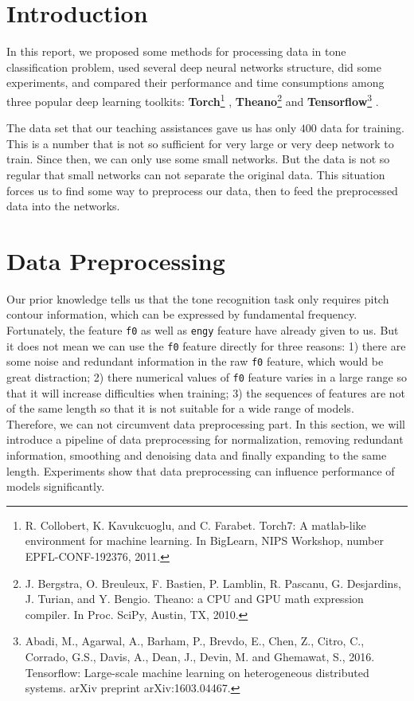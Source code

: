 \documentclass[a4paper]{article}
\begin{document}
\maketitle
\pagebreak

\section{Introduction}

In this report, we proposed some methods for processing data in tone classification problem, used several deep neural networks structure, did some experiments, and compared their performance and time consumptions among three popular deep learning toolkits: {\bf Torch}\footnote{R. Collobert, K. Kavukcuoglu, and C. Farabet. Torch7: A matlab-like environment for machine learning. In BigLearn, NIPS Workshop, number EPFL-CONF-192376, 2011.} , {\bf Theano}\footnote{J. Bergstra, O. Breuleux, F. Bastien, P. Lamblin, R. Pascanu, G. Desjardins, J. Turian, and Y. Bengio. Theano: a CPU and GPU math expression compiler. In Proc. SciPy, Austin, TX, 2010.} and {\bf Tensorflow}\footnote{Abadi, M., Agarwal, A., Barham, P., Brevdo, E., Chen, Z., Citro, C., Corrado, G.S., Davis, A., Dean, J., Devin, M. and Ghemawat, S., 2016. Tensorflow: Large-scale machine learning on heterogeneous distributed systems. arXiv preprint arXiv:1603.04467.} .

The data set that our teaching assistances gave us has only $400$ data for training. This is a number that is not so sufficient for very large or very deep network to train. Since then, we can only use some small networks. But the data is not so regular that small networks can not separate the original data. This situation forces us to find some way to preprocess our data, then to feed the preprocessed data into the networks.

\section{Data Preprocessing}

Our prior knowledge tells us that the tone recognition task only requires pitch contour information, which can be expressed by fundamental frequency. Fortunately, the feature \texttt{f0} as well as \texttt{engy} feature have already given to us. But it does not mean we can use the \texttt{f0} feature directly for three reasons: 1) there are some noise and redundant information in the raw \texttt{f0} feature, which would be great distraction; 2) there numerical values of \texttt{f0} feature varies in a large range so that it will increase difficulties when training; 3) the sequences of features are not of the same length so that it is not suitable for a wide range of models. Therefore, we can not circumvent data preprocessing part. In this section, we will introduce a pipeline of data preprocessing for normalization, removing redundant information, smoothing and denoising data and finally expanding to the same length. Experiments show that data preprocessing can influence performance of models significantly.
\end{document}
